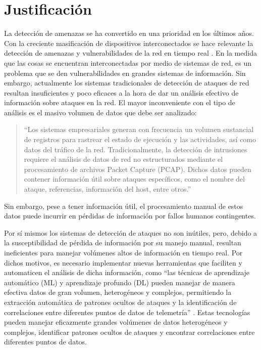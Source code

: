 \documentclass[12pt,a4paper]{article}
\begin{document}
\section{Justificación}

La detección de amenazas se ha convertido en una prioridad en los últimos años. Con la creciente masificación de dispositivos interconectados se hace relevante la detección de amenazas y vulnerabilidades de la red en tiempo real \cite[pág.~1]{alhawawreh2024explainable}. En la medida que las cosas se encuentran interconectadas por medio de sistemas de red, es un problema que se den vulnerabilidades en grandes sistemas de información. Sin embargo, actualmente los sistemas tradicionales de detección de ataques de red resultan insuficientes y poco eficaces a la hora de dar un análisis efectivo de información sobre ataques en la red. El mayor inconveniente con el tipo de análisis es el masivo volumen de datos que debe ser analizado:

\begin{quote}
``Los sistemas empresariales generan con frecuencia un volumen sustancial de registros para rastrear el estado de ejecución y las actividades, así como datos del tráfico de la red. Tradicionalmente, la detección de intrusiones requiere el análisis de datos de red no estructurados mediante el procesamiento de archivos Packet Capture (PCAP). Dichos datos pueden contener información útil sobre ataques específicos, como el nombre del ataque, referencias, información del host, entre otros.'' \cite[pág.~1]{ullah2024ids}
\end{quote}

Sin embargo, pese a tener información útil, el procesamiento manual de estos datos puede incurrir en pérdidas de información por fallos humanos contingentes.

Por sí mismos los sistemas de detección de ataques no son inútiles, pero, debido a la susceptibilidad de pérdida de información por su manejo manual, resultan ineficientes para manejar volúmenes altos de información en tiempo real. Por dichos motivos, es necesario implementar nuevas herramientas que faciliten y automaticen el análisis de dicha información, como ``las técnicas de aprendizaje automático (ML) y aprendizaje profundo (DL) pueden manejar de manera efectiva datos de gran volumen, heterogéneos y complejos, permitiendo la extracción automática de patrones ocultos de ataques y la identificación de correlaciones entre diferentes puntos de datos de telemetría'' \cite[pág.~2]{alhawawreh2024explainable}. Estas tecnologías pueden manejar eficazmente grandes volúmenes de datos heterogéneos y complejos, identificar patrones ocultos de ataques y encontrar correlaciones entre diferentes puntos de datos.
\end{document}
